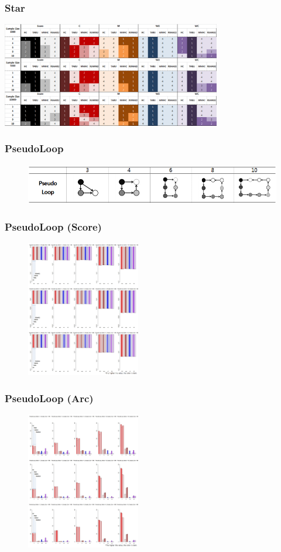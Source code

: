 \documentclass{beamer}
\begin{document}
\begin{frame}
\frametitle{Star}
{\scriptsize{}
	\begin{center}
		\includegraphics[height=130pt]{images/Result_Star}
	\end{center}
}
\end{frame}



\begin{frame}
\frametitle{PseudoLoop}
{\scriptsize{}
	\begin{figure}
		\includegraphics[height=50pt]{images/Topologies_PseudoLoop}
	\end{figure}	
}
\end{frame}



\begin{frame}
\frametitle{PseudoLoop (Score)}
{\scriptsize{}
	\begin{figure}
		\includegraphics[height=170pt]{images/04_PseudoLoop_Score}
	\end{figure}	
}
\end{frame}


\begin{frame}
\frametitle{PseudoLoop (Arc)}
{\scriptsize{}
	\begin{figure}
		\includegraphics[height=170pt]{images/04_PseudoLoop_Arcs}
	\end{figure}	
}
\end{frame}
\end{document}
